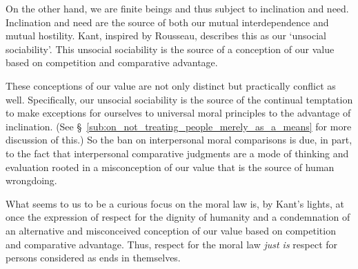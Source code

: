 \documentclass[12pt]{article}
\begin{document}
On the other hand, we are finite beings and thus subject to inclination and need. Inclination and need are the source of both our mutual interdependence and mutual hostility. Kant, inspired by Rousseau, describes this as our `unsocial sociability'. This unsocial sociability is the source of a conception of our value based on competition and comparative advantage. 

These conceptions of our value are not only distinct but practically conflict as well. Specifically, our unsocial sociability is the source of the continual temptation to make exceptions for ourselves to universal moral principles to the advantage of inclination. (See \S~\ref{sub:on_not_treating_people_merely_as_a_means} for more discussion of this.) So the ban on interpersonal moral comparisons is due, in part, to the fact that interpersonal comparative judgments are a mode of thinking and evaluation rooted in a misconception of our value that is the source of human wrongdoing.

What seems to us to be a curious focus on the moral law is, by Kant's lights, at once the expression of respect for the dignity of humanity and a condemnation of an alternative and misconceived conception of our value based on competition and comparative advantage. Thus, respect for the moral law \emph{just is} respect for persons considered as ends in themselves.
\end{document}
